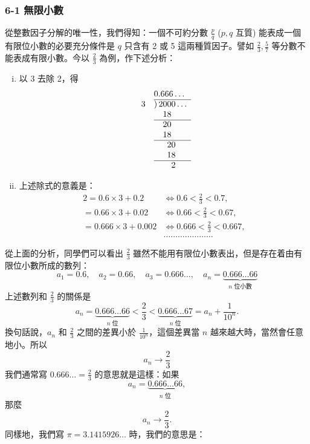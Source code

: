 \subsubsection*{6-1 無限小數}

從整數因子分解的唯一性，我們得知：一個不可約分數 $\frac{p}{q}$ ($p, q$ 互質) 能表成一個有限位小數的必要充分條件是 $q$ 只含有 2 或 5 這兩種質因子。譬如 $\frac{2}{3}, \frac{5}{7}$ 等分數不能表成有限小數。今以 $\frac{2}{3}$ 為例，作下述分析：

\begin{enumerate}[(i)]
    \item 以 3 去除 2，得
    \[
    \begin{array}{r@{\quad}l}
        & 0.666\dots \\
        \cline{2-2}
        3 & )\, 2000\dots \\
        & \phantom{)\, 1} 18 \\
        \cline{2-2}
        & \phantom{)\, 0} 20 \\
        & \phantom{)\, 0} 18 \\
        \cline{2-2}
        & \phantom{)\, 00} 20 \\
        & \phantom{)\, 00} 18 \\
        \cline{2-2}
        & \phantom{)\, 000} 2
    \end{array}
    \]

    \item 上述除式的意義是：
    \begin{align*}
    2 = 0.6\times 3 + 0.2 &\iff 0.6 < \frac{2}{3} < 0.7, \\
    = 0.66\times 3 + 0.02 &\iff 0.66 < \frac{2}{3} < 0.67, \\
    = 0.666\times 3 + 0.002 &\iff 0.666 < \frac{2}{3} < 0.667, \\
    &\dots\dots\dots\dots\dots\dots\dots
    \end{align*}
\end{enumerate}

從上面的分析，同學們可以看出 $\frac{2}{3}$ 雖然不能用有限位小數表出，但是存在着由有限位小數所成的數列：
\[
a_1 = 0.6,\quad a_2 = 0.66,\quad a_3 = 0.666\dots,\quad a_n = \underbrace{0.666\dots 66}_{n\text{ 位小數}}
\]
上述數列和 $\frac{2}{3}$ 的關係是
\[
a_n = \underbrace{0.666\dots 66}_{n\text{ 位}} < \frac{2}{3} < \underbrace{0.666\dots 67}_{n\text{ 位}} = a_n + \frac{1}{10^n}.
\]
換句話說，$a_n$ 和 $\frac{2}{3}$ 之間的差異小於 $\frac{1}{10^n}$，這個差異當 $n$ 越來越大時，當然會任意地小。所以
\[
a_n \to \frac{2}{3}
\]
我們通常寫 $0.666\dots = \frac{2}{3}$ 的意思就是這樣：如果
\[
a_n = \underbrace{0.666\dots 66}_{n\text{ 位}},
\]
那麼
\[
a_n \to \frac{2}{3}.
\]
同樣地，我們寫 $\pi = 3.1415926\dots$ 時，我們的意思是：

